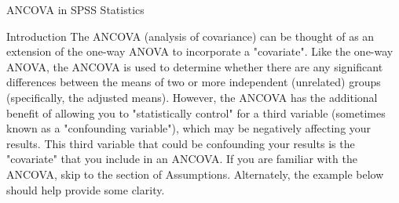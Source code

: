 ANCOVA in SPSS Statistics

Introduction
The ANCOVA (analysis of covariance) can be thought of as an extension of the one-way ANOVA to incorporate a "covariate". Like the one-way ANOVA, the ANCOVA is used to determine whether there are any significant differences between the means of two or more independent (unrelated) groups (specifically, the adjusted means). However, the ANCOVA has the additional benefit of allowing you to "statistically control" for a third variable (sometimes known as a "confounding variable"), which may be negatively affecting your results. This third variable that could be confounding your results is the "covariate" that you include in an ANCOVA. If you are familiar with the ANCOVA, skip to the section of Assumptions. Alternately, the example below should help provide some clarity.

